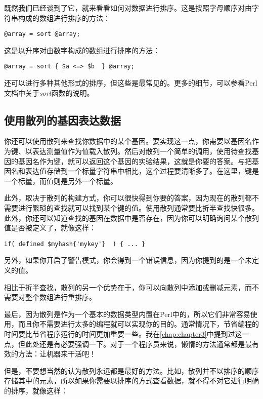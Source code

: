既然我们已经谈到了它，就来看看如何对数据进行排序。这是按照字母顺序对由字符串构成的数组进行排序的方法：

\begin{lstlisting}
@array = sort @array;
\end{lstlisting}

这是以升序对由数字构成的数组进行排序的方法：

\begin{lstlisting}
@array = sort { $a <=> $b  } @array;
\end{lstlisting}

还可以进行多种其他形式的排序，但这些是最常见的。更多的细节，可以参看Perl文档中关于\textit{sort}函数的说明。

\subsection{使用散列的基因表达数据}
你还可以使用散列来查找你数据中的某个基因。要实现这一点，你需要以基因名作为键、以表达测量值作为值载入散列。然后对散列一个简单的调用，使用待查找基因的基因名作为键，就可以返回这个基因的实验结果，这就是你要的答案。与把基因名和表达值存储到一个标量字符串中相比，这个过程要清晰多了。在这里，键是一个标量，而值则是另外一个标量。

此外，取决于散列的构建方式，你可以很快得到你要的答案，因为现在的散列都不需要进行繁琐的查找就可以找到某个键的值。使用散列通常要比折半查找快很多。此外，你还可以知道查找的基因在数据中是否存在，因为你可以明确询问某个散列值是否被定义了，就像这样：

\begin{lstlisting}
if( defined $myhash{'mykey'}  ) { ... }
\end{lstlisting}

另外，如果你开启了警告模式，你会得到一个错误信息，因为你提到的是一个未定义的值。

相比于折半查找，散列的另一个优势在于，你可以向散列中添加或删减元素，而不需要对整个数组进行重排序。

最后，因为散列是作为一个基本的数据类型内置在Perl中的，所以它们非常容易使用，而且你不需要进行太多的编程就可以实现你的目的。通常情况下，节省编程的时间要比节省程序运行的时间更加重要一些。我在\autoref{chap:chapter3}中提到过这一点，但此处还是有必要强调一下。对于一个程序员来说，懒惰的方法通常都是最有效的方法：让机器来干活吧！

但是，不要想当然的认为散列永远都是最好的方法。比如，散列并不以排序的顺序存储其中的元素，所以如果你需要以排序的方式查看数据，就不得不对它进行明确的排序，就像这样：

